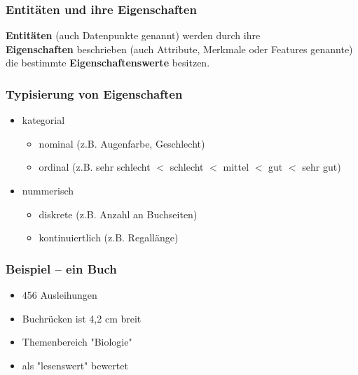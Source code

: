 \documentclass[aspectratio=169]{beamer}
\begin{document}
\begin{frame}
  \frametitle{Entitäten und ihre Eigenschaften}
  \begin{block}{}
    \begin{center}
      \textbf{Entitäten} (auch Datenpunkte genannt) werden durch ihre\\
      \textbf{Eigenschaften} beschrieben (auch Attribute, Merkmale
      oder Features genannte) die bestimmte
      \textbf{Eigenschaftenswerte} besitzen.
    \end{center}
  \end{block}    
\end{frame}

\begin{frame}
  \frametitle{Typisierung von Eigenschaften}
  \begin{block}{}
    \begin{itemize}
    \item kategorial
      \begin{itemize}
      \item nominal (z.B. Augenfarbe, Geschlecht)
      \item ordinal (z.B. sehr schlecht $<$ schlecht $<$ mittel $<$ gut $<$ sehr gut)
      \end{itemize}
    \item nummerisch
      \begin{itemize}
      \item diskrete (z.B. Anzahl an Buchseiten)
      \item kontinuiertlich (z.B. Regallänge)  
      \end{itemize}
    \end{itemize}
  \end{block}
\end{frame}


\begin{frame}
  \frametitle{Beispiel -- ein Buch}
  \begin{block}{}
    \begin{itemize}
    \item 456 Ausleihungen
    \item Buchrücken ist 4,2 cm breit
    \item Themenbereich "Biologie"
    \item als "lesenswert" bewertet
    \end{itemize}
  \end{block}    
\end{frame}
\end{document}
